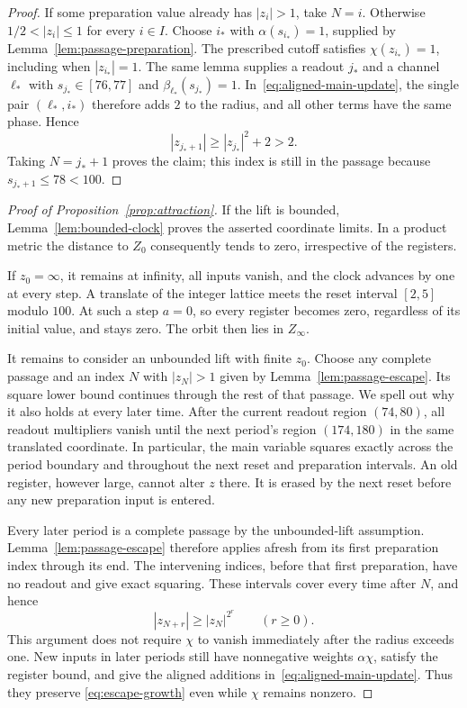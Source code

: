 \begin{proof}
If some preparation value already has $|z_i|>1$, take $N=i$.  Otherwise
$1/2<|z_i|\le1$ for every $i\in I$.  Choose $i_*$ with
$\alpha(s_{i_*})=1$, supplied by Lemma~\ref{lem:passage-preparation}.
The prescribed cutoff satisfies $\chi(z_{i_*})=1$, including when
$|z_{i_*}|=1$.  The same lemma supplies a readout $j_*$ and a channel $\ell_*$
with $s_{j_*}\in[76,77]$ and $\beta_{\ell_*}(s_{j_*})=1$.
In~\eqref{eq:aligned-main-update}, the single pair $(\ell_*,i_*)$ therefore
adds $2$ to the radius, and all other terms have the same phase.  Hence
\[
 |z_{j_*+1}|\ge |z_{j_*}|^2+2>2.
\]
Taking $N=j_*+1$ proves the claim; this index is still in the passage
because $s_{j_*+1}\le78<100$.
\end{proof}

\begin{proof}[Proof of Proposition~\ref{prop:attraction}]
If the lift is bounded, Lemma~\ref{lem:bounded-clock} proves the asserted
coordinate limits.  In a product metric the distance to $Z_0$ consequently
tends to zero, irrespective of the registers.

If $z_0=\infty$, it remains at infinity, all inputs vanish, and the clock
advances by one at every step.  A translate of the integer lattice meets
the reset interval $[2,5]$ modulo $100$.  At such a step $a=0$, so every
register becomes zero, regardless of its initial value, and stays zero.
The orbit then lies in $Z_\infty$.

It remains to consider an unbounded lift with finite $z_0$.  Choose any
complete passage and an index $N$ with $|z_N|>1$ given by
Lemma~\ref{lem:passage-escape}.  Its square lower bound continues through
the rest of that passage.  We spell out why it also holds at every later
time.  After the current readout region $(74,80)$, all readout multipliers
vanish until the next period's region $(174,180)$ in the same translated
coordinate.  In particular, the main variable squares exactly across the
period boundary and throughout the next reset and preparation intervals.
An old register, however large, cannot alter $z$ there.  It is erased by
the next reset before any new preparation input is entered.

Every later period is a complete passage by the unbounded-lift assumption.
Lemma~\ref{lem:passage-escape} therefore applies afresh from its first
preparation index through its end.  The intervening indices, before that
first preparation, have no readout and give exact squaring.  These intervals
cover every time after $N$, and hence
\begin{equation}\label{eq:escape-growth}
 |z_{N+r}|\ge |z_N|^{2^r}\qquad(r\ge0).
\end{equation}
This argument does not require $\chi$ to vanish immediately after the
radius exceeds one.  New inputs in later periods still have nonnegative
weights $\alpha\chi$, satisfy the register bound, and give the aligned
additions in~\eqref{eq:aligned-main-update}.  Thus they preserve
\eqref{eq:escape-growth} even while $\chi$ remains nonzero.


\end{proof}
